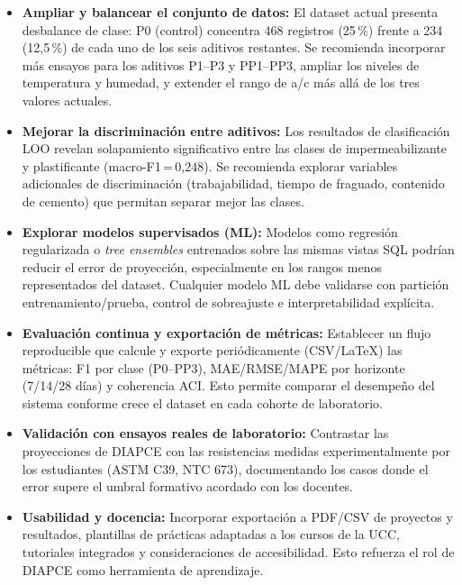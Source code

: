 \begin{itemize}
  \item \textbf{Ampliar y balancear el conjunto de datos:} El dataset actual presenta desbalance de clase: P0 (control) concentra 468 registros (25\,\%) frente a 234 (12{,}5\,\%) de cada uno de los seis aditivos restantes. Se recomienda incorporar más ensayos para los aditivos P1--P3 y PP1--PP3, ampliar los niveles de temperatura y humedad, y extender el rango de a/c más allá de los tres valores actuales.

  \item \textbf{Mejorar la discriminación entre aditivos:} Los resultados de clasificación LOO revelan solapamiento significativo entre las clases de impermeabilizante y plastificante (macro-F1\,=\,0{,}248). Se recomienda explorar variables adicionales de discriminación (trabajabilidad, tiempo de fraguado, contenido de cemento) que permitan separar mejor las clases.

  \item \textbf{Explorar modelos supervisados (ML):} Modelos como regresión regularizada o \textit{tree ensembles} entrenados sobre las mismas vistas SQL podrían reducir el error de proyección, especialmente en los rangos menos representados del dataset. Cualquier modelo ML debe validarse con partición entrenamiento/prueba, control de sobreajuste e interpretabilidad explícita.

  \item \textbf{Evaluación continua y exportación de métricas:} Establecer un flujo reproducible que calcule y exporte periódicamente (CSV/\LaTeX) las métricas: F1 por clase (P0--PP3), MAE/RMSE/MAPE por horizonte (7/14/28 días) y coherencia ACI. Esto permite comparar el desempeño del sistema conforme crece el dataset en cada cohorte de laboratorio.

  \item \textbf{Validación con ensayos reales de laboratorio:} Contrastar las proyecciones de DIAPCE con las resistencias medidas experimentalmente por los estudiantes (ASTM C39, NTC 673), documentando los casos donde el error supere el umbral formativo acordado con los docentes.

  \item \textbf{Usabilidad y docencia:} Incorporar exportación a PDF/CSV de proyectos y resultados, plantillas de prácticas adaptadas a los cursos de la UCC, tutoriales integrados y consideraciones de accesibilidad. Esto refuerza el rol de DIAPCE como herramienta de aprendizaje.


\end{itemize}
